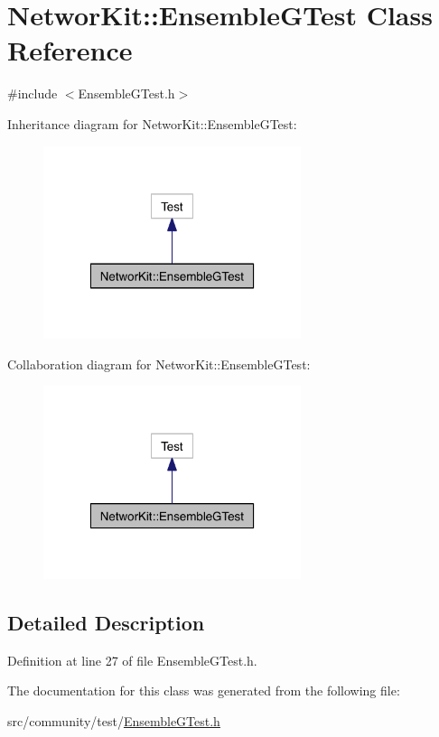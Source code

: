 \hypertarget{class_networ_kit_1_1_ensemble_g_test}{\section{Networ\-Kit\-:\-:Ensemble\-G\-Test Class Reference}
\label{class_networ_kit_1_1_ensemble_g_test}
}


{\ttfamily \#include $<$Ensemble\-G\-Test.\-h$>$}



Inheritance diagram for Networ\-Kit\-:\-:Ensemble\-G\-Test\-:\nopagebreak
\begin{figure}[H]
\begin{center}
\leavevmode
\includegraphics[width=214pt]{class_networ_kit_1_1_ensemble_g_test__inherit__graph}
\end{center}
\end{figure}


Collaboration diagram for Networ\-Kit\-:\-:Ensemble\-G\-Test\-:\nopagebreak
\begin{figure}[H]
\begin{center}
\leavevmode
\includegraphics[width=214pt]{class_networ_kit_1_1_ensemble_g_test__coll__graph}
\end{center}
\end{figure}


\subsection{Detailed Description}


Definition at line 27 of file Ensemble\-G\-Test.\-h.



The documentation for this class was generated from the following file\-:\begin{DoxyCompactItemize}
\item 
src/community/test/\hyperlink{_ensemble_g_test_8h}{Ensemble\-G\-Test.\-h}\end{DoxyCompactItemize}
